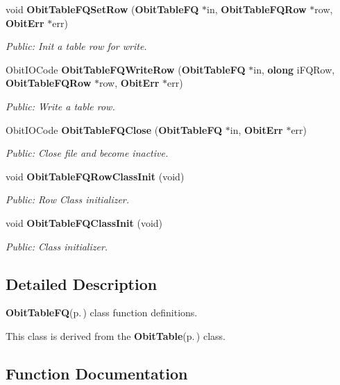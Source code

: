 \begin{CompactItemize}
void {\bf Obit\-Table\-FQSet\-Row} ({\bf Obit\-Table\-FQ} $\ast$in, {\bf Obit\-Table\-FQRow} $\ast$row, {\bf Obit\-Err} $\ast$err)
\begin{CompactList}\small\item\em Public: Init a table row for write. \item\end{CompactList}\item 
Obit\-IOCode {\bf Obit\-Table\-FQWrite\-Row} ({\bf Obit\-Table\-FQ} $\ast$in, {\bf olong} i\-FQRow, {\bf Obit\-Table\-FQRow} $\ast$row, {\bf Obit\-Err} $\ast$err)
\begin{CompactList}\small\item\em Public: Write a table row. \item\end{CompactList}\item 
Obit\-IOCode {\bf Obit\-Table\-FQClose} ({\bf Obit\-Table\-FQ} $\ast$in, {\bf Obit\-Err} $\ast$err)
\begin{CompactList}\small\item\em Public: Close file and become inactive. \item\end{CompactList}\item 
void {\bf Obit\-Table\-FQRow\-Class\-Init} (void)
\begin{CompactList}\small\item\em Public: Row Class initializer. \item\end{CompactList}\item 
void {\bf Obit\-Table\-FQClass\-Init} (void)
\begin{CompactList}\small\item\em Public: Class initializer. \item\end{CompactList}\end{CompactItemize}


\subsection{Detailed Description}
{\bf Obit\-Table\-FQ}{\rm (p.\,\pageref{structObitTableFQ})} class function definitions. 

This class is derived from the {\bf Obit\-Table}{\rm (p.\,\pageref{structObitTable})} class.

\subsection{Function Documentation}
